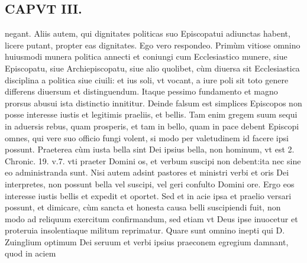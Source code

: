 \documentclass{article}
\begin{document}
\begin{pages}
\section*{CAPVT  III. }
\marginpar{[ p.187 ]}\pstart negant. Aliis autem, qui dignitates politicas suo Episcopatui adiunctas habent, licere putant, propter eas dignitates. Ego vero respondeo. Primùm vitiose omnino huiusmodi munera politica annecti et coniungi cum Ecclesiastico munere, siue Episcopatu, siue Archiepiscopatu, siue alio quolibet, cùm diuersa sit Ecclesiastica disciplina a politica siue ciuili: et ius soli, vt vocant, a iure poli sit toto genere differens diuersum et distinguendum. Itaque pessimo fundamento et magno prorsus abusui ista distinctio innititur. Deinde falsum est simplices Episcopos non posse interesse iustis et legitimis praeliis, et bellis. Tam enim gregem suum sequi in aduersis rebus, quam prosperis, et tam in bello, quam in pace debent Episcopi omnes, qui vere suo officio fungi volent, si modo per valetudinem id facere ipsi possunt. Praeterea cùm iusta bella sint Dei ipsius bella, non hominum, vt est 2. Chronic. 19. v.7. vti praeter Domini os, et verbum suscipi non debent:ita nec sine eo administranda sunt. Nisi autem adsint pastores et ministri verbi et oris Dei interpretes, non possunt bella vel suscipi, vel geri confulto Domini ore. Ergo eos interesse iustis bellis et expedit et oportet. Sed et in acie ipsa et praelio versari possunt, et dimicare, cùm sancta et honesta causa belli suscipiendi fuit, non modo ad reliquum exercitum confirmandum, sed etiam vt Deus ipse inuocetur et proteruia insolentiaque militum reprimatur. Quare sunt omnino inepti qui D. Zuinglium optimum Dei seruum et verbi ipsius praeconem egregium damnant, quod in aciem  \pend

\end{pages}
\end{document}

